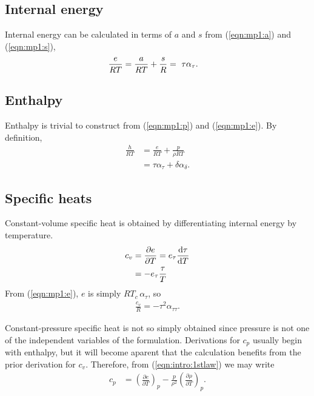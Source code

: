 \subsection{Internal energy}\label{sec:mp1:e}

Internal energy can be calculated in terms of $a$ and $s$ from (\ref{eqn:mp1:a}) and (\ref{eqn:mp1:s}),
\begin{align}
\frac{e}{R T} &= \frac{a}{RT} + \frac{s}{R} \vspace{2em} =\ \tau \alpha_\tau\label{eqn:mp1:e}.
\end{align}

\subsection{Enthalpy}\label{sec:mp1:h}

Enthalpy is trivial to construct from (\ref{eqn:mp1:p}) and (\ref{eqn:mp1:e}).  By definition, 
\begin{align}
\frac{h}{R T} &= \frac{e}{RT} + \frac{p}{\rho R T}\nonumber\\
 &= \tau \alpha_\tau + \delta \alpha_\delta.\label{eqn:mp1:h}
\end{align}

\subsection{Specific heats}\label{sec:mp1:c}

Constant-volume specific heat is obtained by differentiating internal energy by temperature.
\begin{align*}
c_v &= \frac{\partial e}{\partial T} = e_\tau \frac{\mathrm{d} \tau}{\mathrm{d} T}\\
 &= -e_\tau \frac{\tau}{T}
\end{align*}
From (\ref{eqn:mp1:e}), $e$ is simply $R T_c \, \alpha_\tau$, so
\begin{align}
\frac{c_v}{R} = - \tau^2 \alpha_{\tau\tau}\label{eqn:mp1:cv}.
\end{align}

Constant-pressure specific heat is not so simply obtained since pressure is not one of the independent variables of the formulation.  Derivations for $c_p$ usually begin with enthalpy, but it will become aparent that the calculation benefits from the prior derivation for $c_v$.  Therefore, from (\ref{eqn:intro:1stlaw}) we may write
\begin{align*}
c_p &= \left(\frac{\partial e}{\partial T}\right)_p - \frac{p}{\rho^2} \left(\frac{\partial \rho}{\partial T}\right)_p.
\end{align*}

